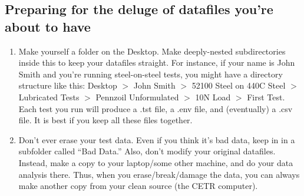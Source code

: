 \documentclass[10pt, letterpaper]{article}
\begin{document}
\subsection{Preparing for the deluge of datafiles you're about to have}
\begin{enumerate}

\item Make yourself a folder on the Desktop. Make deeply-nested subdirectories inside this to keep your datafiles straight. For instance, if your name is John Smith and you're running steel-on-steel tests, you might have a directory structure like this: Desktop $>$ John Smith $>$ 52100 Steel on 440C Steel $>$ Lubricated Tests $>$ Pennzoil Unformulated $>$ 10N Load $>$ First Test. Each test you run will produce a .tst file, a .env file, and (eventually) a .csv file. It is best if you keep all these files together.

\item Don't ever erase your test data. Even if you think it's bad data, keep in in a subfolder called ``Bad Data.'' Also, don't modify your original datafiles. Instead, make a copy to your laptop/some other machine, and do your data analysis there. Thus, when you erase/break/damage the data, you can always make another copy from your clean source (the CETR computer). 
\end{enumerate}
\end{document}
